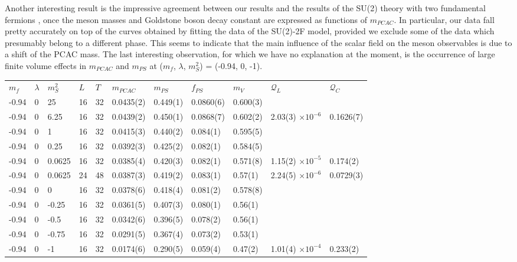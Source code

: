 Another interesting result is the impressive agreement between our results and the results  of the SU(2) theory with two fundamental fermions \cite{Arthur:2016dir}, once the meson masses and Goldstone boson decay constant are expressed as functions of $m_{PCAC}$. In particular, our data fall pretty accurately on top of the curves obtained by fitting the data of the SU(2)-2F model, provided we exclude some of the data which presumably belong to a different phase. This seems to indicate that the main influence of the scalar field on the meson observables is due to a shift of the PCAC mass. The last interesting observation, for which we have no explanation at the moment, is the occurrence of large finite volume effects in $m_{PCAC}$ and $m_{PS}$ at ($m_f$, $\lambda$, $m_S^2$) = (-0.94, 0, -1).


\begin{table}
\begin{adjustwidth}{-4em}{-4em}
\begin{tabular}{l  l l l l l l l l l l}
\toprule
$m_f$ & $\lambda$ & $m_S^2$ & $L$ & $T$ & $m_{PCAC}$ & $m_{PS}$ & $f_{PS}$ & $m_V$ & $\mathcal Q_L$ & $\mathcal Q_C$ \\ 
\hhline{===========}
-0.94 & 0 & 25 & 16 & 32 & 0.0435(2) & 0.449(1) & 0.0860(6) & 0.600(3) \\
-0.94 & 0 & 6.25 & 16 & 32 & 0.0439(2) & 0.450(1) & 0.0868(7) & 0.602(2) & 2.03(3) $\times 10^{-6}$ & 0.1626(7)\\
-0.94 & 0 & 1 & 16 & 32 & 0.0415(3) & 0.440(2) & 0.084(1) & 0.595(5)\\
-0.94 & 0 & 0.25 & 16 & 32 & 0.0392(3) & 0.425(2) & 0.082(1) & 0.584(5) \\
-0.94 & 0 & 0.0625 & 16 & 32 & 0.0385(4) & 0.420(3) & 0.082(1) & 0.571(8) & 1.15(2) $\times 10^{-5}$ & 0.174(2)\\
-0.94 & 0 & 0.0625 & 24 & 48 & 0.0387(3) & 0.419(2) & 0.083(1) & 0.57(1) &  2.24(5) $\times 10^{-6}$ & 0.0729(3)\\
-0.94 & 0 & 0 & 16 & 32 & 0.0378(6) & 0.418(4) & 0.081(2) & 0.578(8)\\
-0.94 & 0 & -0.25 & 16 & 32 & 0.0361(5) & 0.407(3) & 0.080(1) & 0.56(1)\\
-0.94 & 0 & -0.5 & 16 & 32 & 0.0342(6) & 0.396(5) & 0.078(2) & 0.56(1)\\
-0.94 & 0 & -0.75 & 16 & 32 & 0.0291(5) & 0.367(4) & 0.073(2) & 0.53(1)\\
-0.94 & 0 & -1 & 16 & 32 & 0.0174(6) & 0.290(5) & 0.059(4) & 0.47(2) & 1.01(4) $\times 10^{-4}$ & 0.233(2)\\

\end{tabular}
\end{adjustwidth}
\end{table}
